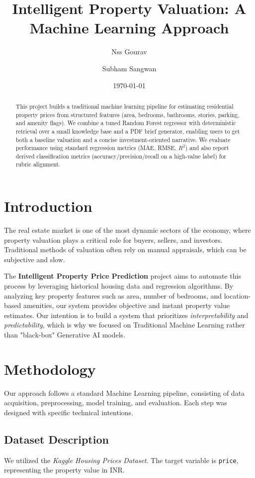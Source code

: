 \documentclass[12pt,a4paper]{article}
\title{\textbf{Intelligent Property Valuation: A Machine Learning Approach}}
\author{Nss Gourav \and Subham Sangwan}
\date{\today}
\begin{document}
\maketitle

\begin{abstract}
This project builds a traditional machine learning pipeline for estimating residential property prices from structured features (area, bedrooms, bathrooms, stories, parking, and amenity flags). We combine a tuned Random Forest regressor with deterministic retrieval over a small knowledge base and a PDF brief generator, enabling users to get both a baseline valuation and a concise investment-oriented narrative. We evaluate performance using standard regression metrics (MAE, RMSE, $R^2$) and also report derived classification metrics (accuracy/precision/recall on a high-value label) for rubric alignment.
\end{abstract}
\newpage

\tableofcontents
\newpage

\section{Introduction}
The real estate market is one of the most dynamic sectors of the economy, where property valuation plays a critical role for buyers, sellers, and investors. Traditional methods of valuation often rely on manual appraisals, which can be subjective and slow. 

The \textbf{Intelligent Property Price Prediction} project aims to automate this process by leveraging historical housing data and regression algorithms. By analyzing key property features such as area, number of bedrooms, and location-based amenities, our system provides objective and instant property value estimates. Our intention is to build a system that prioritizes \textit{interpretability} and \textit{predictability}, which is why we focused on Traditional Machine Learning rather than "black-box" Generative AI models.

\section{Methodology}
Our approach follows a standard Machine Learning pipeline, consisting of data acquisition, preprocessing, model training, and evaluation. Each step was designed with specific technical intentions.

\subsection{Dataset Description}
We utilized the \textit{Kaggle Housing Prices Dataset}. The target variable is \texttt{price}, representing the property value in INR.
\end{document}

